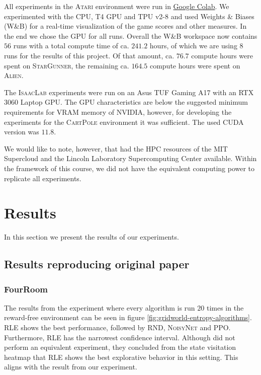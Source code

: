 \documentclass[10pt]{article} %
\begin{document}
\noindent All experiments in the \textsc{Atari} environment were run in \href{https://colab.research.google.com/}{Google Colab}. We experimented with the CPU, T4 GPU and TPU v2-8 and used Weights \& Biases (W\&B) for a real-time visualization of the game scores and other measures. In the end we chose the GPU for all runs. Overall the W\&B workspace now contains $56$ runs with a total compute time of ca. $241.2$ hours, of which we are using $8$ runs for the results of this project. Of that amount, ca. $76.7$ compute hours were spent on \textsc{StarGunner}, the remaining ca. $164.5$ compute hours were spent on \textsc{Alien}.

The \textsc{IsaacLab} experiments were run on an Asus TUF Gaming A17 with an RTX 3060 Laptop GPU. The GPU characteristics are below the suggested minimum requirements for VRAM memory of NVIDIA, however, for developing the experiments for the \textsc{CartPole} environment it was sufficient. The used CUDA version was $11.8$.

\noindent We would like to note, however, that \cite{rle-paper} had the HPC resources of the MIT Supercloud and the Lincoln Laboratory Supercomputing Center available. Within the framework of this course, we did not have the equivalent computing power to replicate all experiments.

\hypertarget{sec4}{\section{Results}}

In this section we present the results of our experiments.

\subsection{Results reproducing original paper}

\subsubsection{FourRoom}

The results from the experiment where every algorithm is run $20$ times in the reward-free environment can be seen in figure \ref{fig:gridworld-entropy-algorithms}. \textsc{RLE} shows the best performance, followed by \textsc{RND}, \textsc{NoisyNet} and \textsc{PPO}. Furthermore, \textsc{RLE} has the narrowest confidence interval. Although \cite{rle-paper} did not perform an equivalent experiment, they concluded from the state visitation heatmap that \textsc{RLE} shows the best explorative behavior in this setting. This aligns with the result from our experiment. 
\end{document}
